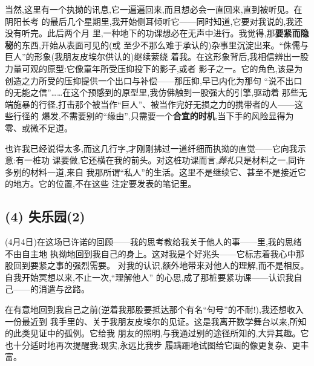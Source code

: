 \pmark 当然,这里有一个执拗的讯息,它一遍遍回来,而且想必会一直回来,直到被听见。在阴阳长考
的最后几个星期里,我开始侧耳倾听它——同时知道,它要对我说的,我还没有听完。此后两个月
里,一种地下的功课想必在无声中进行。我觉得,那\textbf{要紧而隐秘}的东西,开始从表面可见的(或
至少不那么难于承认的)杂事里沉淀出来。“侏儒与巨人”的形象(我朋友皮埃尔供认的)继续萦绕
着我。在这形象背后,我相信辨出一股力量可观的原型:它像童年所受压抑投下的影子,或者
影子之一。它的角色,该是为创造之力所受的压抑提供一个出口与补偿——那压抑,早已内化为那句
“说不出口的无能之信”……在这个预感到的原型里,我仿佛触到一股强大的引擎,驱动着
那些无端施暴的行径,打击那个被当作“巨人”、被当作完好无损之力的携带者的人——这些行径的
爆发,不需要别的“缘由”,只需要一个\textbf{合宜的时机},当下手的风险显得为零、或微不足道。

也许我已经说得太多,而这几行字,才刚刚拂过一道纤细而执拗的直觉——它向我示意:有一桩功
课要做,它还横在我的前头。对这桩功课而言,\emph{葬礼}只是材料之一,同许多别的材料一道,来自
我那所谓“私人”的生活\dmark{}。这里不是继续它、甚至不是接近它的地方。它的位置,不在这些
注定要发表的笔记里。

\subsection{(4) 失乐园(2)}   %


(4月4日)在这场已许诺的回顾——我的思考教给我关于他人的事——里,我的思绪不由自主地
执拗地回到我自己的身上。这对我是个好兆头——它标志着我心中那股回到要紧之事的强烈需要。
对我的认识,额外地带来对他人的理解,而不是相反。自我开始冥想以来,不止一次,“理解他人”
的心思,成了那桩要紧功课——认识我自己——的消遣与岔路。

在有意地回到我自己之前(逆着我那股要抵达那个有名“句号”的不耐!),我还想收入一份最近到
我手里的、关于我朋友皮埃尔的见证。这是我离开数学舞台以来,所知的此类见证中的孤例。它给我
朋友的照明,与我通过别的途径所知的,大异其趣。它也十分适时地再次提醒我:现实,永远比我步
履蹒跚地试图给它画的像更复杂、更丰富。

